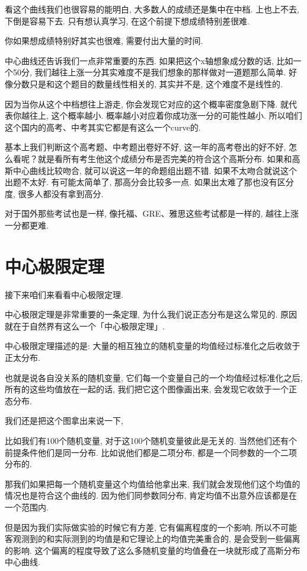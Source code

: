 看这个曲线我们也很容易的能明白, 大多数人的成绩还是集中在中档. 上也上不去, 下倒是容易下去. 只有想认真学习, 在这个前提下想成绩特别差很难. 

你如果想成绩特别好其实也很难, 需要付出大量的时间. 

中心曲线还告诉我们一点非常重要的东西. 如果把这个x轴想象成分数的话, 比如一个50分, 我们越往上涨一分其实难度不是我们想象的那样做对一道题那么简单. 好像分数只是和这个题目的数量线性相关的, 其实并不是, 这个难度不是线性的. 

因为当你从这个中档想往上游走, 你会发现它对应的这个概率密度急剧下降. 就代表你越往上, 这个概率越小. 概率越小对应着你成功涨一分的可能性越小. 所以咱们这个国内的高考、中考其实它都是有这么一个curve的. 

基本上我们判断这个高考题、中考题出卷好不好, 这一年的高考卷出的好不好, 怎么看呢？就是看所有考生他这个成绩分布是否完美的符合这个高斯分布. 如果和高斯中心曲线比较吻合, 就可以说这一年的命题组出题不错. 如果不太吻合就说这个出题不太好. 有可能太简单了, 那高分会比较多一点. 如果出太难了那也没有区分度, 很多人都没有拿到高分. 

对于国外那些考试也是一样, 像托福、GRE、雅思这些考试都是一样的, 越往上涨一分都更难. 

\section{中心极限定理}

接下来咱们来看看中心极限定理. 

中心极限定理是非常重要的一条定理, 为什么我们说正态分布是这么常见的. 原因就在于自然界有这么一个「中心极限定理」. 

中心极限定理描述的是: 大量的相互独立的随机变量的均值经过标准化之后收敛于正太分布. 

也就是说各自没关系的随机变量, 它们每一个变量自己的一个均值经过标准化之后, 所有的这些均值放在一起的话, 我们把它这个图像画出来, 会发现它收敛于一个正态分布. 

我们还是把这个图拿出来说一下, 

比如我们有100个随机变量, 对于这100个随机变量彼此是无关的. 当然他们还有个前提条件他们是同一分布. 比如说他们都是二项分布, 都是一个同参数的一个二项分布的. 

那我们如果把每一个随机变量这个均值给他拿出来, 我们就会发现他们这个均值的情况也是符合这个曲线的. 因为他们同参数同分布, 肯定均值不出意外应该都是在一个范围内. 

但是因为我们实际做实验的时候它有方差, 它有偏离程度的一个影响, 所以不可能客观测到的和实际测到的均值是和它理论上的均值完美重合的, 是会受到一些偏离的影响. 这个偏离的程度导致了这么多随机变量的均值叠在一块就形成了高斯分布中心曲线. 


